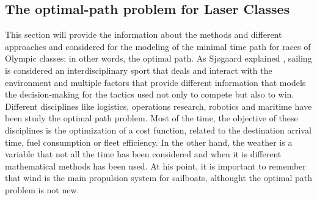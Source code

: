 \subsection{The optimal-path problem for Laser Classes}
This section will provide the information about the methods and different approaches and considered for the modeling of the minimal time path for races of Olympic classes; in other words, the optimal path.  As Sjøgaard explained \cite{sjogaard2015science},  sailing is considered an interdisciplinary sport that deals and interact with the environment and multiple factors that provide different information that models the decision-making for the tactics used not only to compete but also to win.  Different disciplines like logistics, operations research, robotics and maritime have been study the optimal path problem. 
Most of the time, the objective of these disciplines is  the optimization of a cost function, related to the destination arrival time, fuel consumption or fleet efficiency. In the other hand, the weather is a variable that not all the time has been considered and when it is different mathematical methods has been used. %
At his point, it is important to remember that wind is the main propulsion system for sailboats, althought the optimal path problem is not  new.\\
